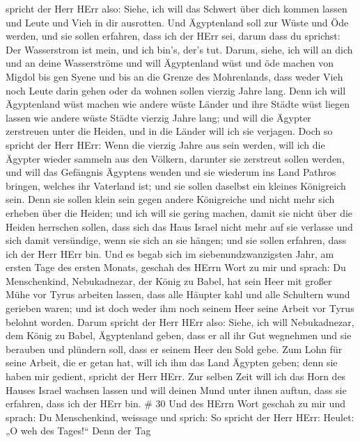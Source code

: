 spricht der Herr HErr also: Siehe, ich will das Schwert über dich kommen
lassen und Leute und Vieh in dir ausrotten.  Und Ägyptenland
soll zur Wüste und Öde werden, und sie sollen erfahren, dass ich der
HErr sei, darum dass du sprichst: Der Wasserstrom ist mein, und ich
bin's, der's tut.  Darum, siehe, ich will an dich und an
deine Wasserströme und will Ägyptenland wüst und öde machen von Migdol
bis gen Syene und bis an die Grenze des Mohrenlands,  dass
weder Vieh noch Leute darin gehen oder da wohnen sollen vierzig Jahre
lang.  Denn ich will Ägyptenland wüst machen wie andere
wüste Länder und ihre Städte wüst liegen lassen wie andere wüste Städte
vierzig Jahre lang; und will die Ägypter zerstreuen unter die Heiden,
und in die Länder will ich sie verjagen.  Doch so spricht
der Herr HErr: Wenn die vierzig Jahre aus sein werden, will ich die
Ägypter wieder sammeln aus den Völkern, darunter sie zerstreut sollen
werden,  und will das Gefängnis Ägyptens wenden und sie
wiederum ins Land Pathros bringen, welches ihr Vaterland ist; und sie
sollen daselbst ein kleines Königreich sein.  Denn sie
sollen klein sein gegen andere Königreiche und nicht mehr sich erheben
über die Heiden; und ich will sie gering machen, damit sie nicht über
die Heiden herrschen sollen,  dass sich das Haus Israel
nicht mehr auf sie verlasse und sich damit versündige, wenn sie sich an
sie hängen; und sie sollen erfahren, dass ich der Herr HErr bin.
 Und es begab sich im siebenundzwanzigsten Jahr, am ersten
Tage des ersten Monats, geschah des HErrn Wort zu mir und sprach:
 Du Menschenkind, Nebukadnezar, der König zu Babel, hat
sein Heer mit großer Mühe vor Tyrus arbeiten lassen, dass alle Häupter
kahl und alle Schultern wund gerieben waren; und ist doch weder ihm noch
seinem Heer seine Arbeit vor Tyrus belohnt worden.  Darum
spricht der Herr HErr also: Siehe, ich will Nebukadnezar, dem König zu
Babel, Ägyptenland geben, dass er all ihr Gut wegnehmen und sie berauben
und plündern soll, dass er seinem Heer den Sold gebe.  Zum
Lohn für seine Arbeit, die er getan hat, will ich ihm das Land Ägypten
geben; denn sie haben mir gedient, spricht der Herr HErr. 
Zur selben Zeit will ich das Horn des Hauses Israel wachsen lassen und
will deinen Mund unter ihnen auftun, dass sie erfahren, dass ich der
HErr bin. \# 30  Und des HErrn Wort geschah zu mir und
sprach:  Du Menschenkind, weissage und sprich: So spricht
der Herr HErr: Heulet: „O weh des Tages!{}``  Denn der Tag
